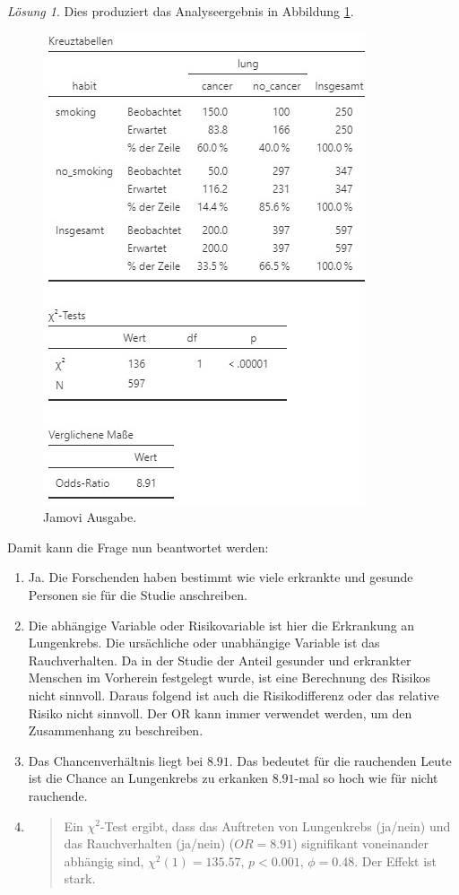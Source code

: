 \documentclass[
]{book}
\theoremstyle{definition}
\theoremstyle{definition}
\theoremstyle{definition}
\theoremstyle{definition}
\theoremstyle{remark}
\newtheorem*{solution}{Lösung}
\begin{document}
\begin{solution}
Dies produziert das Analyseergebnis in Abbildung
\ref{fig:sol-cancer-smoking-output}.

\begin{figure}

{\centering \includegraphics{figures/09-exr-cancer-smoking-jmv-output} 

}

\caption{Jamovi Ausgabe.}\label{fig:sol-cancer-smoking-output}
\end{figure}

Damit kann die Frage nun beantwortet werden:

\begin{enumerate}
\def\labelenumi{\alph{enumi})}
\item
  Ja. Die Forschenden haben bestimmt wie viele erkrankte und gesunde
  Personen sie für die Studie anschreiben.
\item
  Die abhängige Variable oder Risikovariable ist hier die Erkrankung
  an Lungenkrebs. Die ursächliche oder unabhängige Variable ist das
  Rauchverhalten. Da in der Studie der Anteil gesunder und erkrankter
  Menschen im Vorherein festgelegt wurde, ist eine Berechnung des
  Risikos nicht sinnvoll. Daraus folgend ist auch die Risikodifferenz
  oder das relative Risiko nicht sinnvoll. Der OR kann immer verwendet
  werden, um den Zusammenhang zu beschreiben.
\item
  Das Chancenverhältnis liegt bei \(8.91\). Das bedeutet für die
  rauchenden Leute ist die Chance an Lungenkrebs zu erkanken
  \(8.91\)-mal so hoch wie für nicht rauchende.
\item
  \begin{quote}
  Ein \(\chi^2\)-Test ergibt, dass das Auftreten von Lungenkrebs (ja/nein) und das Rauchverhalten (ja/nein) (\(OR = 8.91\)) signifikant voneinander abhängig sind, \(\chi^2 (1) = 135.57\), \(p < 0.001\), \(\phi = 0.48.\) Der Effekt ist stark.
  \end{quote}
\end{enumerate}


\end{solution}
\end{document}
